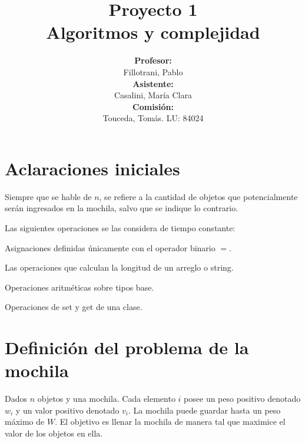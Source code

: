\documentclass[a4paper,10pt,spanish]{article}
\begin{document}
\begin{titlepage}

\title{{\bf Proyecto 1}\\ Algoritmos y complejidad\vspace{10mm}}
\author{{\bf Profesor:}\\ Fillotrani, Pablo\\
{\bf Asistente:}\\ Casalini, Mar\'ia Clara\\
{\bf Comisi\'on:}\\ Touceda, Tom\'as. LU: 84024}
\date{}

\maketitle

\thispagestyle{empty}

\end{titlepage}

\newpage

\tableofcontents

\newpage

\section{Aclaraciones iniciales}

Siempre que se hable de $n$, se refiere a la cantidad de objetos que potencialmente ser\'an ingresados en la mochila, salvo que se indique lo contrario.

Las siguientes operaciones se las considera de tiempo constante:
\begin{list}{}{}
 \item Asignaciones definidas \'unicamente con el operador binario $=$.
 \item Las operaciones que calculan la longitud de un arreglo o string.
 \item Operaciones aritm\'eticas sobre tipos base.
 \item Operaciones de set y get de una clase.
\end{list}


\section{Definici\'on del problema de la mochila}

Dados $n$ objetos y una mochila. Cada elemento $i$ posee un peso positivo denotado $w_i$ y un valor positivo denotado $v_i$. La mochila puede guardar hasta un peso m\'aximo de $W$. El objetivo es llenar la mochila de manera tal que maximice el valor de los objetos en ella.
\end{document}
